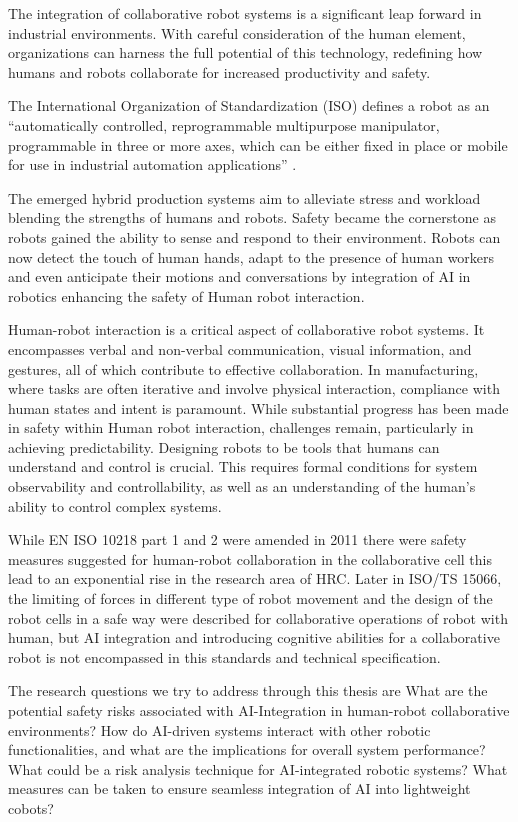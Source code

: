 The integration of collaborative robot systems is a significant leap forward in industrial environments. With careful consideration of the human element, organizations can harness the full potential of this technology, redefining how humans and robots collaborate for increased productivity and safety.

 The International Organization of Standardization (ISO) defines a robot as an “automatically controlled, reprogrammable multipurpose manipulator, programmable in three or more axes, which can be either fixed in place or mobile for use in industrial automation applications” .\cite{author2}
 
 The emerged hybrid production systems aim to alleviate stress and workload blending the strengths of humans and robots. Safety became the cornerstone as robots gained the ability to sense and respond to their environment. Robots can now detect the touch of human hands, adapt to the presence of human workers and even anticipate their motions and conversations by integration of AI in robotics enhancing the safety of Human robot interaction. 
 
 Human-robot interaction is a critical aspect of collaborative robot systems. It encompasses verbal and non-verbal communication, visual information, and gestures, all of which contribute to effective collaboration. In manufacturing, where tasks are often iterative and involve physical interaction, compliance with human states and intent is paramount. While substantial progress has been made in safety within Human robot interaction, challenges remain, particularly in achieving predictability. Designing robots to be tools that humans can understand and control is crucial. This requires formal conditions for system observability and controllability, as well as an understanding of the human's ability to control complex systems.\cite{author3}

While EN ISO 10218 part 1 and 2  were amended in 2011 there were safety measures suggested for human-robot collaboration in the collaborative cell this lead to an exponential rise in the research area of HRC.
Later in ISO/TS 15066, the limiting of forces in different type of robot movement and the design of the robot cells in a safe way were described for collaborative operations of robot with human, but AI integration and introducing cognitive abilities for a collaborative robot is not encompassed in this standards and technical specification.

The research questions we try to address through this thesis are 
What are the potential safety risks associated with AI-Integration in human-robot collaborative environments? How do AI-driven systems interact with other robotic functionalities, and what are the implications for overall system performance? What could be a risk analysis technique for AI-integrated robotic systems? What measures can be taken to ensure seamless integration of AI into lightweight cobots?


